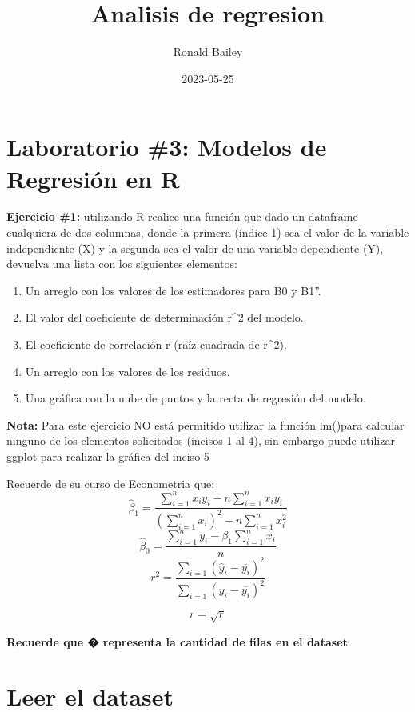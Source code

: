 \documentclass[
]{article}
\title{Analisis de regresion}
\author{Ronald Bailey}
\date{2023-05-25}
\providecommand{\tightlist}{%
  \setlength{\itemsep}{0pt}\setlength{\parskip}{0pt}}
\begin{document}
\maketitle

\hypertarget{laboratorio-3-modelos-de-regresiuxf3n-en-r}{%
\section{\texorpdfstring{\textbf{Laboratorio \#3: Modelos de Regresión
en
R}}{Laboratorio \#3: Modelos de Regresión en R}}\label{laboratorio-3-modelos-de-regresiuxf3n-en-r}}

\textbf{Ejercicio \#1:} utilizando R realice una función que dado un
dataframe cualquiera de dos columnas, donde la primera (índice 1) sea el
valor de la variable independiente (X) y la segunda sea el valor de una
variable dependiente (Y), devuelva una lista con los siguientes
elementos:

\begin{enumerate}
\def\labelenumi{\arabic{enumi}.}
\tightlist
\item
  Un arreglo con los valores de los estimadores para B0 y B1''.
\item
  El valor del coeficiente de determinación r\^{}2 del modelo.
\item
  El coeficiente de correlación r (raíz cuadrada de r\^{}2).
\item
  Un arreglo con los valores de los residuos.
\item
  Una gráfica con la nube de puntos y la recta de regresión del modelo.
\end{enumerate}

\textbf{Nota:} Para este ejercicio NO está permitido utilizar la función
lm()para calcular ninguno de los elementos solicitados (incisos 1 al 4),
sin embargo puede utilizar ggplot para realizar la gráfica del inciso 5

Recuerde de su curso de Econometria que: \[
\hat{\beta}_1 = \frac{\sum _{i=1}^nx_iy_i -n \sum _{i=1}^nx_iy_i}{(\sum _{i=1}^n x_i )^2 - n\sum _{i=1}^n x_i^2}
\] \[
\hat{\beta}_0 = \frac{\sum _{i=1}^ny_i -\beta_1 \sum _{i=1}^nx_i}{n}
\] \[
r^2= \frac{\sum _{i=1}(\hat y_i - \overline{y_i} )^2 }{ \sum _{i=1}( y_i - \overline{y_i} )^2}
\]

\[
r= \sqrt{r}
\]

\textbf{Recuerde que � representa la cantidad de filas en el dataset}

\hypertarget{leer-el-dataset}{%
\section{Leer el dataset}\label{leer-el-dataset}}
\end{document}
